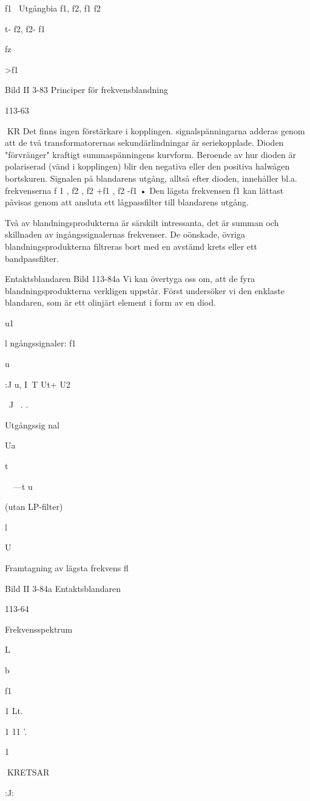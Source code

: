 f1~ Utgångbia f1, f2, f1
f2

t- f2, f2- f1

fz

>f1

Bild II 3-83 Principer för frekvensblandning

113-63

KR
Det finns ingen förstärkare i kopplingen.
signalspänningarna adderas genom att de
två transformatorernas sekundärlindningar
är seriekopplade. Dioden "förvränger" kraftigt summaspänningens kurvform. Beroende
av hur dioden är polariserad (vänd i kopplingen) blir den negativa eller den positiva
halwågen bortskuren.
Signalen på blandarens utgång, alltså
efter dioden, innehåller bl.a. frekvenserna f 1 ,
f2 , f2 +f1 , f2 -f1 • Den lägsta frekvensen f1 kan
lättast påvisas genom att ansluta ett lågpassfilter till blandarens utgång.

Två av blandningsprodukterna är särskilt
intressanta, det är summan och skillnaden
av ingångssignalernas frekvenser. De oönskade, övriga blandningsprodukterna filtreras bort med en avstämd krets eller ett
bandpassfilter.

Entaktsblandaren
Bild 113-84a
Vi kan övertyga oss om, att de fyra blandningsprodukterna verkligen uppstår. Först
undersöker vi den enklaste blandaren, som
är ett olinjärt element i form av en diod.

u1

l ngångssignaler:
f1

u

:J u, I~T
Ut+ U2

~J~ . .

Utgångssig nal

Ua

t

~~---t
u

(utan LP-filter)

l

U

Framtagning av lägsta frekvens fl

Bild II 3-84a Entaktsblandaren

113-64

Frekvensspektrum

L

b

f1

1 Lt.~

1 11
'.


1

KRETSAR

:J:

